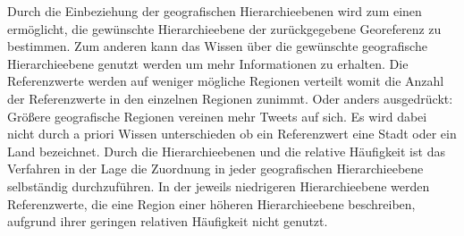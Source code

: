 			Durch die Einbeziehung der geografischen Hierarchieebenen wird zum einen ermöglicht, die gewünschte Hierarchieebene der zurückgegebene Georeferenz zu bestimmen.
			Zum anderen kann das Wissen über die gewünschte geografische Hierarchieebene genutzt werden um mehr Informationen zu erhalten.
			Die Referenzwerte werden auf weniger mögliche Regionen verteilt womit die Anzahl der Referenzwerte in den einzelnen Regionen zunimmt.
			Oder anders ausgedrückt: Größere geografische Regionen vereinen mehr Tweets auf sich. 
			Es wird dabei nicht durch a priori Wissen unterschieden ob ein Referenzwert eine Stadt oder ein Land bezeichnet. 
			Durch die Hierarchieebenen und die relative Häufigkeit ist das Verfahren in der Lage die Zuordnung in jeder geografischen Hierarchieebene selbständig durchzuführen.
			In der jeweils niedrigeren Hierarchieebene werden Referenzwerte, die eine Region einer höheren Hierarchieebene beschreiben, aufgrund ihrer geringen relativen Häufigkeit nicht genutzt.  

	\newpage
	
	
			
		



	